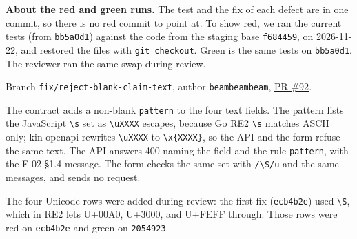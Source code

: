 \textbf{About the red and green runs.} The test and the fix of each defect are in one commit, so there is no red commit to point at.
To show red, we ran the current tests (from \texttt{bb5a0d1}) against the code from the staging base \texttt{f684459}, on 2026-11-22, and restored the files with \texttt{git checkout}. Green is the same tests on \texttt{bb5a0d1}. The reviewer ran the same swap during review.


Branch \texttt{fix/reject-blank-claim-text}, author \texttt{beambeambeam}, \href{https://github.com/beambeambeam/claimflow/pull/92}{PR \#92}.

The contract adds a non-blank \texttt{pattern} to the four text fields. The pattern lists the JavaScript \texttt{\textbackslash s} set as \texttt{\textbackslash uXXXX} escapes, because Go RE2 \texttt{\textbackslash s} matches ASCII only; kin-openapi rewrites \texttt{\textbackslash uXXXX} to \texttt{\textbackslash x\{XXXX\}}, so the API and the form refuse the same text.
The API answers 400 naming the field and the rule \texttt{pattern}, with the F-02 §1.4 message. The form checks the same set with \texttt{/\textbackslash S/u} and the same messages, and sends no request.





The four Unicode rows were added during review: the first fix (\texttt{ecb4b2e}) used \texttt{\textbackslash S}, which in RE2 lets U+00A0, U+3000, and U+FEFF through. Those rows were red on \texttt{ecb4b2e} and green on \texttt{2054923}.

